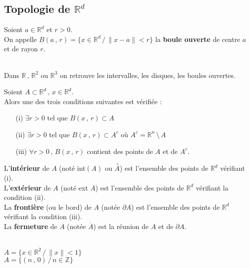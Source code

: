 \documentclass[class=report,crop=false]{standalone}
\begin{document}
\subsection{Topologie de $\mathbb{R}^d$}


\begin{definition}
Soient $a \in \mathbb{R}^d$ et $r > 0$.\\
On appelle $B(a\,,\,r) = \lbrace x \in \mathbb{R}^d \,/\, \|x - a\| < r \rbrace$ la {\bf boule ouverte} de centre $a$ et de rayon $r$.
\end{definition}


\\
Dans $\mathbb{R}\,,\,\mathbb{R}^2$ ou $\mathbb{R}^3$ on retrouve les intervalles, les disques, les boules ouvertes.


\begin{proposition}
Soient $A \subset \mathbb{R}^d\,,\,x \in \mathbb{R}^d$.\\
Alors une des trois conditions suivantes est vérifiée :
\begin{enumerate}
\item[(i)]   $\exists r > 0$ tel que $B(x\,,\,r) \subset A$
\item[(ii)] $\exists r > 0$ tel que $B(x\,,\,r) \subset A^c$ o\`u $A^c = \mathbb{R}^n\,\setminus\,A$
\item[(iii)]  $\forall r > 0\,,\,B(x\,,\,r)$ contient des points de $A$ et de $A^c$.
\end{enumerate}
\end{proposition}

\begin{definition}
L'{\bf intérieur} de $A$ (noté int$(A)$ ou $\stackrel{\,\circ}{A}$) est l'ensemble des points de $\mathbb{R}^d$ vérifiant (i).\\
L'{\bf extérieur} de $A$ (noté ext $A$) est l'ensemble des points de $\mathbb{R}^d$ vérifiant la condition (ii).\\
La {\bf fronti\`ere} (ou le bord) de $A$ (notée $\partial A$) est l'ensemble des points de $\mathbb{R}^d$ vérifiant la condition (iii).\\
La {\bf fermeture} de $A$ (notée $\overline{A}$) est la réunion de $A$ et de $\partial A$.
\end{definition}


\\
$A = \lbrace x \in \mathbb{R}^2 \,/ \, \|x\| < 1 \rbrace$\\
$A = \lbrace (n\,,\,0) \,/\, n \in \mathbb{Z} \rbrace$ 
\end{document}
